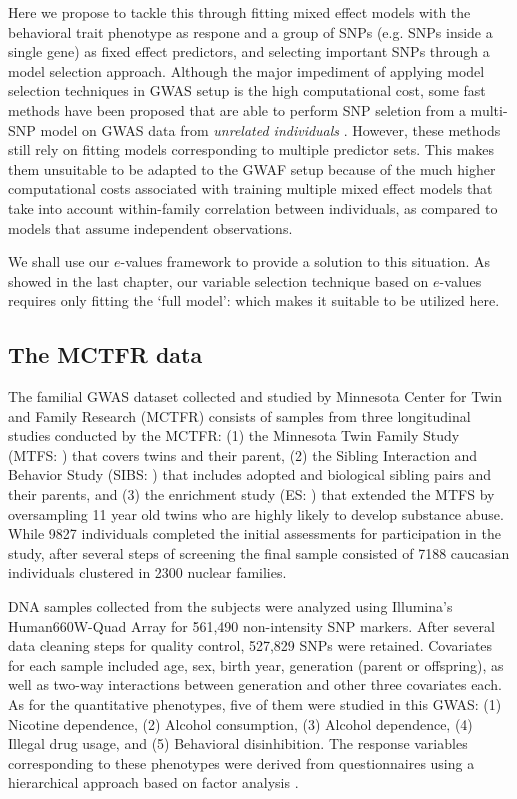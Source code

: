 Here we propose to tackle this through fitting mixed effect models with the behavioral trait phenotype as respone and a group of SNPs (e.g. SNPs inside a single gene) as fixed effect predictors, and selecting important SNPs through a model selection approach. Although the major impediment of applying model selection techniques in GWAS setup is the high computational cost, some fast methods have been proposed that are able to perform SNP seletion from a multi-SNP model on GWAS data from \textit{unrelated individuals} \citep{ZhangEtal14,FrommeletEtal12}. However, these methods still rely on fitting models corresponding to multiple predictor sets. This makes them unsuitable to be adapted to the GWAF setup because of the much higher computational costs associated with training multiple mixed effect models that take into account within-family correlation between individuals, as compared to models that assume independent observations.

We shall use our $e$-values framework to provide a solution to this situation. As showed in the last chapter, our variable selection technique based on $e$-values requires only fitting the `full model': which makes it suitable to be utilized here.

\subsection{The MCTFR data}
The familial GWAS dataset collected and studied by Minnesota Center for Twin and Family Research (MCTFR)\citep{LiEtal11, MillerEtal12, McGueEtal13} consists of samples from three longitudinal studies conducted by the MCTFR: (1) the Minnesota Twin Family Study (MTFS: \cite{IaconoEtal99}) that covers twins and their parent, (2) the Sibling Interaction and Behavior Study (SIBS: \cite{McGueEtal07}) that includes adopted and biological sibling pairs and their parents, and (3) the enrichment study (ES: \cite{KeyesEtal09}) that extended the MTFS by oversampling 11 year old twins who are highly likely to develop substance abuse. While 9827 individuals completed the initial assessments for participation in the study, after several steps of screening the final sample consisted of 7188 caucasian individuals clustered in 2300 nuclear families. %

DNA samples collected from the subjects were analyzed using Illumina’s Human660W-Quad Array for 561,490 non-intensity SNP markers. After several data cleaning steps for quality control, 527,829 SNPs were retained. Covariates for each sample included age, sex, birth year, generation (parent or offspring), as well as two-way interactions between generation and other three covariates each. As for the quantitative phenotypes, five of them were studied in this GWAS: (1) Nicotine dependence, (2) Alcohol consumption, (3) Alcohol dependence, (4) Illegal drug usage, and (5) Behavioral disinhibition. The response variables corresponding to these phenotypes were derived from questionnaires using a hierarchical approach based on factor analysis \citep{HicksEtal11}.

